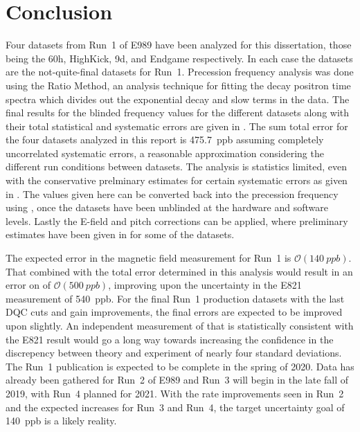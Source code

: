 
\thispagestyle{myheadings} %

\chapter{Conclusion}
\label{chapter:Conclusion}


Four datasets from Run~1 of E989 have been analyzed for this dissertation, those being the 60h, HighKick, 9d, and Endgame respectively. In each case the datasets are the not-quite-final datasets for Run~1. Precession frequency analysis was done using the Ratio Method, an analysis technique for fitting the decay positron time spectra which divides out the exponential decay and slow terms in the data. The final results for the blinded frequency \R values for the different datasets along with their total statistical and systematic errors are given in . The sum total error for the four datasets analyzed in this report is \SI{475.7}{ppb} assuming completely uncorrelated systematic errors, a reasonable approximation considering the different run conditions between datasets. The analysis is statistics limited, even with the conservative prelminary estimates for certain systematic errors as given in . The \R values given here can be converted back into the precession frequency \wa using , once the datasets have been unblinded at the hardware and software levels. Lastly the E-field and pitch corrections can be applied, where preliminary estimates have been given in  for some of the datasets. 


The expected error in the magnetic field measurement for Run~1 is $\mathcal{O}(\SI{140}{ppb})$. That combined with the total error determined in this analysis would result in an error on \amu of $\mathcal{O}(\SI{500}{ppb})$, improving upon the uncertainty in the E821 measurement of \SI{540}{ppb}. For the final Run~1 production datasets with the last DQC cuts and gain improvements, the final errors are expected to be improved upon slightly. An independent measurement of \amu that is statistically consistent with the E821 result would go a long way towards increasing the confidence in the discrepency between theory and experiment of nearly four standard deviations. The Run~1 publication is expected to be complete in the spring of 2020. Data has already been gathered for Run~2 of E989 and Run~3 will begin in the late fall of 2019, with Run~4 planned for 2021. With the rate improvements seen in Run~2 and the expected increases for Run~3 and Run~4, the target uncertainty goal of \SI{140}{ppb} is a likely reality.





